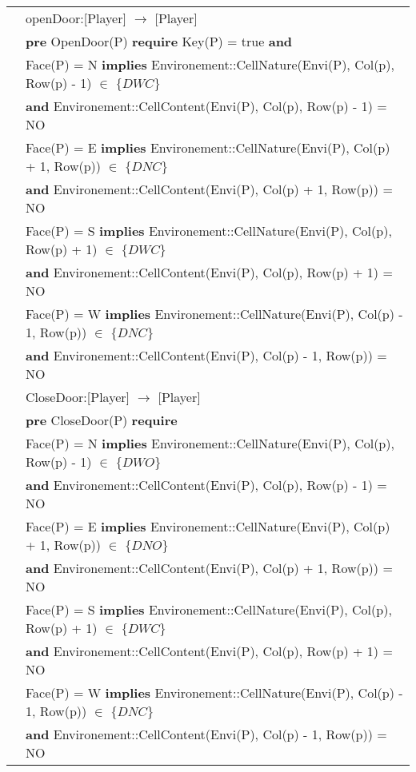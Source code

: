\documentclass[11pt]{article}
\begin{document}
\begin{tabular}{rl}
& \quad openDoor:[Player] $\rightarrow$ [Player]\\
& 
\quad\quad \textbf{pre} OpenDoor(P) \textbf{require} Key(P) = true \textbf{and}\\
& 
\quad\quad\quad 
Face(P) = N  \textbf{implies}  Environement::CellNature(Envi(P), Col(p), Row(p) - 1) $\in$ $\{ DWC\}$ \\
& \quad\quad \textbf{and}  Environement::CellContent(Envi(P), Col(p), Row(p) - 1) = NO\\
[0.2cm]
& 
\quad\quad\quad Face(P) = E \textbf{implies} Environement::CellNature(Envi(P), Col(p) + 1, Row(p)) $\in$ $\{ DNC\}$ \\
& \quad\quad  \textbf{and}  Environement::CellContent(Envi(P), Col(p) + 1, Row(p)) = NO\\
[0.2cm]
& \quad\quad\quad Face(P) = S \textbf{implies} Environement::CellNature(Envi(P), Col(p), Row(p) + 1) $\in$ $\{ DWC\}$\\
&
\quad\quad \textbf{and}  Environement::CellContent(Envi(P), Col(p), Row(p) + 1) = NO\\
[0.2cm]
& 
\quad\quad\quad Face(P) = W \textbf{implies} Environement::CellNature(Envi(P), Col(p) - 1, Row(p)) $\in$ $\{ DNC\}$ \\
&
\quad\quad \textbf{and}  Environement::CellContent(Envi(P), Col(p) - 1, Row(p)) = NO\\
[0.5cm]
& \quad CloseDoor:[Player] $\rightarrow$ [Player]\\
&
\quad\quad \textbf{pre} CloseDoor(P) \textbf{require} \\
[0.2cm]
&
\quad\quad Face(P) = N \textbf{implies} Environement::CellNature(Envi(P), Col(p), Row(p) - 1) $\in$ $\{ DWO\}$ \\
&
\textbf{and}  Environement::CellContent(Envi(P), Col(p), Row(p) - 1) = NO\\
[0.2cm]
&
\quad\quad\quad Face(P) = E \textbf{implies} Environement::CellNature(Envi(P), Col(p) + 1, Row(p)) $\in$ $\{ DNO\}$ \\
&
\quad\quad \textbf{and}  Environement::CellContent(Envi(P), Col(p) + 1, Row(p)) = NO\\
[0.2cm]
&
\quad\quad\quad Face(P) = S \textbf{implies} Environement::CellNature(Envi(P), Col(p), Row(p) + 1) $\in$ $\{ DWC\}$ 
\\&
\quad\quad \textbf{and}  Environement::CellContent(Envi(P), Col(p), Row(p) + 1) = NO\\
[0.2cm]
&
\quad\quad\quad Face(P) = W \textbf{implies} Environement::CellNature(Envi(P), Col(p) - 1, Row(p)) $\in$ $\{DNC\}$ \\
&
\quad\quad\textbf{and}  Environement::CellContent(Envi(P), Col(p) - 1, Row(p)) = NO

\end{tabular}\\
\end{document}
